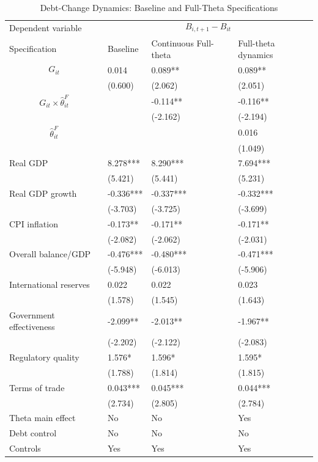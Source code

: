 \begin{table}[H]\centering
\begin{threeparttable}
\caption{Debt-Change Dynamics: Baseline and Full-Theta Specifications}
\label{tab:debt_change_combined_fulltheta}
\scriptsize
\begin{tabularx}{\textwidth}{lYYY}
\toprule
Dependent variable &  \\
\cmidrule(lr){2-4}
Specification & Baseline & Continuous Full-theta & Full-theta dynamics \\
\midrule
$$G_{it}$$ & 0.014 & 0.089** & 0.089** \\
 & (0.600) & (2.062) & (2.051) \\
$$G_{it}\times\widehat{\theta}^{F}_{it}$$ &  & -0.114** & -0.116** \\
 &  & (-2.162) & (-2.194) \\
$$\widehat{\theta}^{F}_{it}$$ &  &  & 0.016 \\
 &  &  & (1.049) \\
Real GDP & 8.278*** & 8.290*** & 7.694*** \\
 & (5.421) & (5.441) & (5.231) \\
Real GDP growth & -0.336*** & -0.337*** & -0.332*** \\
 & (-3.703) & (-3.725) & (-3.699) \\
CPI inflation & -0.173** & -0.171** & -0.171** \\
 & (-2.082) & (-2.062) & (-2.031) \\
Overall balance/GDP & -0.476*** & -0.480*** & -0.471*** \\
 & (-5.948) & (-6.013) & (-5.906) \\
International reserves & 0.022 & 0.022 & 0.023 \\
 & (1.578) & (1.545) & (1.643) \\
Government effectiveness & -2.099** & -2.013** & -1.967** \\
 & (-2.202) & (-2.122) & (-2.083) \\
Regulatory quality & 1.576* & 1.596* & 1.595* \\
 & (1.788) & (1.814) & (1.815) \\
Terms of trade & 0.043*** & 0.045*** & 0.044*** \\
 & (2.734) & (2.805) & (2.784) \\
\midrule
Theta main effect & No & No & Yes \\
Debt control & No & No & No \\
Controls & Yes & Yes & Yes \\

\end{tabularx}
\end{threeparttable}
\end{table}
